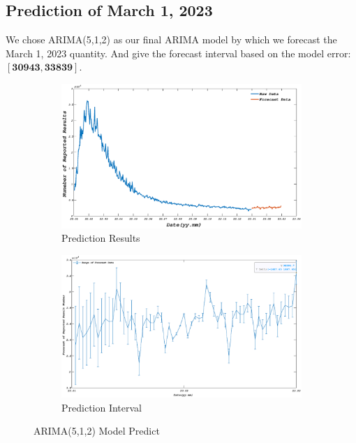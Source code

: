 \documentclass[12pt]{article}  %
\begin{document}
\subsection{Prediction of March 1, 2023}
We chose ARIMA(5,1,2) as our final ARIMA model by which we forecast the March 1, 2023 quantity. And give the forecast interval based on the model error:$\bm{[30943,33839]}$.
\begin{figure}[htbp]
\centering
\begin{subfigure}[b]{.49\textwidth}
\includegraphics[width=\textwidth]{img/yuce.eps}\caption{Prediction Results}
\end{subfigure}
\begin{subfigure}[b]{.49\textwidth}
\includegraphics[width=\textwidth]{img/wucha.eps}\caption{Prediction Interval}
\end{subfigure}
\caption{ARIMA(5,1,2) Model Predict}
\end{figure}
\end{document}
